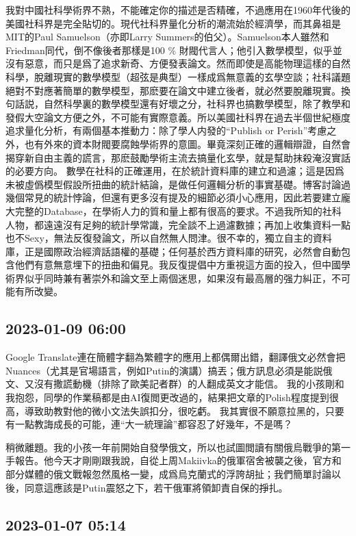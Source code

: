 \documentclass[twocolumn]{ctexart}
\begin{document}
我對中國社科學術界不熟，不能確定你的描述是否精確，不過應用在1960年代後的美國社科界是完全貼切的。現代社科界量化分析的潮流始於經濟學，而其鼻祖是MIT的Paul Samuelson（亦即Larry Summers的伯父）。Samuelson本人雖然和Friedman同代，倒不像後者那樣是100 \% 財閥代言人；他引入數學模型，似乎並沒有惡意，而只是爲了追求新奇、方便發表論文。然而即使是高能物理這樣的自然科學，脫離現實的數學模型（超弦是典型）一樣成爲無意義的玄學空談；社科議題絕對不對應著簡單的數學模型，那麽要在論文中建立後者，就必然要脫離現實。換句話説，自然科學裏的數學模型還有好壞之分，社科界也搞數學模型，除了教學和發假大空論文方便之外，不可能有實際意義。所以美國社科界在過去半個世紀極度追求量化分析，有兩個基本推動力：除了學人内發的“Publish or Perish”考慮之外，也有外來的資本財閥要腐蝕學術界的意圖。畢竟深刻正確的邏輯辯證，自然會揭穿新自由主義的謊言，那麽鼓勵學術主流去搞量化玄學，就是幫助抹殺淹沒實話的必要方向。
數學在社科的正確運用，在於統計資料庫的建立和過濾；這是因爲未被虛僞模型假設所扭曲的統計結論，是做任何邏輯分析的事實基礎。博客討論過幾個常見的統計悖論，但還有更多沒有提及的細節必須小心應用，因此若要建立龐大完整的Database，在學術人力的質和量上都有很高的要求。不過我所知的社科人物，都遠遠沒有足夠的統計學常識，完全談不上過濾數據；再加上收集資料一點也不Sexy，無法反復發論文，所以自然無人問津。很不幸的，獨立自主的資料庫，正是國際政治經濟話語權的基礎；任何基於西方資料庫的研究，必然會自動包含他們有意無意埋下的扭曲和偏見。我反復提倡中方重視這方面的投入，但中國學術界似乎同時兼有著崇外和論文至上兩個迷思，如果沒有最高層的强力糾正，不可能有所改變。
\subsection*{2023-01-09 06:00}

Google Translate連在簡體字翻為繁體字的應用上都偶爾出錯，翻譯俄文必然會把Nuances（尤其是官場語言，例如Putin的演講）搞丟；俄方訊息必須是能説俄文、又沒有撒謊動機（排除了歐美記者群）的人翻成英文才能信。
我的小孩剛和我抱怨，同學的作業稿都是由AI復閲更改過的，結果把文章的Polish程度提到很高，導致助教對他的微小文法失誤扣分，很吃虧。
我其實很不願意拉黑的，只要有一點教誨成長的可能，連“大一統理論”都容忍了好幾年，不是嗎？

稍微離題。我的小孩一年前開始自發學俄文，所以也試圖閲讀有關俄烏戰爭的第一手報告。他今天才剛剛跟我說，自從上周Makiivka的俄軍宿舍被襲之後，官方和部分媒體的俄文戰報忽然風格一變，成爲烏克蘭式的浮誇胡扯；我們簡單討論以後，同意這應該是Putin震怒之下，若干俄軍將領卸責自保的掙扎。
\subsection*{2023-01-07 05:14}
\end{document}
